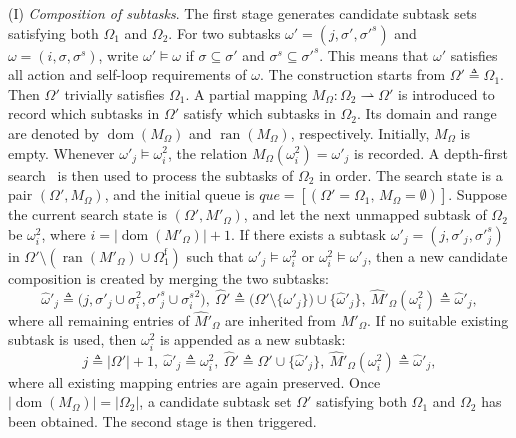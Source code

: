 (I) \emph{Composition of subtasks}.
The first stage generates candidate subtask sets satisfying both $\Omega_1$ and
$\Omega_2$. For two subtasks
$\omega'=(j,\sigma',{\sigma'}^{s})$ and
$\omega=(i,\sigma,\sigma^{s})$, write $\omega' \models \omega$ if
$\sigma \subseteq \sigma'$ and $\sigma^{s}\subseteq {\sigma'}^{s}$. This means
that $\omega'$ satisfies all action and self-loop requirements of $\omega$.
The construction starts from $\Omega' \triangleq \Omega_1$. Then $\Omega'$
trivially satisfies $\Omega_1$. A partial mapping
$M_{\Omega} : \Omega_2 \rightharpoonup \Omega'$ is introduced to record which
subtasks in $\Omega'$ satisfy which subtasks in $\Omega_2$. Its domain and
range are denoted by $\operatorname{dom}(M_{\Omega})$ and
$\operatorname{ran}(M_{\Omega})$, respectively. Initially, $M_{\Omega}$ is
empty. Whenever $\omega'_j \models \omega_i^2$, the relation
$M_{\Omega}(\omega_i^2)=\omega'_j$ is recorded.
A depth-first search~\citep{kozen1992depth} is then used to process the subtasks
of $\Omega_2$ in order. The search state is a pair $(\Omega',M_{\Omega})$, and
the initial queue is
$que=[(\Omega'=\Omega_1,\,M_{\Omega}=\emptyset)]$. Suppose the current search
state is $(\Omega',M'_{\Omega})$, and let the next unmapped subtask of
$\Omega_2$ be $\omega_i^2$, where
$i=|\operatorname{dom}(M'_{\Omega})|+1$. If there exists a subtask
$\omega'_j=(j,\sigma'_j,{\sigma'}_j^{s})$ in
$\Omega'\setminus
(\operatorname{ran}(M'_{\Omega})\cup\Omega_1^{\mathrm{f}})$ such that
$\omega'_j \models \omega_i^2$ or $\omega_i^2 \models \omega'_j$, then a new
candidate composition is created by merging the two subtasks:
\begin{equation}
\label{ch04:eq:generate_new_subtask}
\hat{\omega}'_j \triangleq
\bigl(j,\sigma'_j\cup\sigma_i^2,{\sigma'}_j^{s}\cup{\sigma_i^{s}}^{2}\bigr),\
\hat{\Omega}' \triangleq
\bigl(\Omega' \setminus \{\omega'_j\}\bigr)\cup\{\hat{\omega}'_j\},\
\hat{M}'_{\Omega}(\omega_i^2) \triangleq \hat{\omega}'_j,
\end{equation}
where all remaining entries of $\hat{M}'_{\Omega}$ are inherited from
$M'_{\Omega}$.
If no suitable existing subtask is used, then $\omega_i^2$ is appended as a
new subtask:
\begin{equation}
\label{ch04:eq:generate_new_subtask2}
j \triangleq |\Omega'|+1,\
\hat{\omega}'_j \triangleq \omega_i^2,\
\hat{\Omega}' \triangleq \Omega' \cup \{\hat{\omega}'_j\},\
\hat{M}'_{\Omega}(\omega_i^2) \triangleq \hat{\omega}'_j,
\end{equation}
where all existing mapping entries are again preserved. Once
$|\operatorname{dom}(M_{\Omega})| = |\Omega_2|$, a candidate subtask set
$\Omega'$ satisfying both $\Omega_1$ and $\Omega_2$ has been obtained. The
second stage is then triggered.

